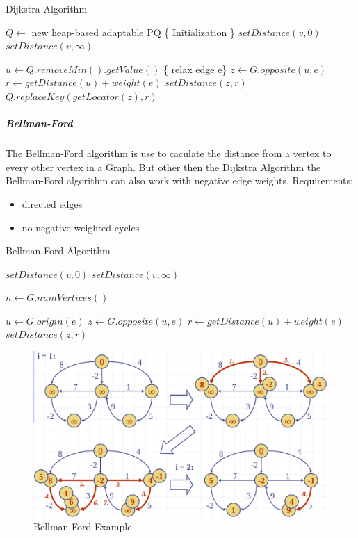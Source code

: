 \documentclass[11pt,twoside,twocolumn,landscape]{article}
\begin{document}
\begin{algorithm}
  \caption{Dijkstra Algorithm}
  \begin{algorithmic}
    \State $Q \gets$ new heap-based adaptable PQ
    \State \{ Initialization \}
    \State $setDistance(v, 0)$
    \Else
    \State $setDistance(v, \infty)$
    \EndIf
    \EndFor

    \State $u \gets Q.removeMin().getValue()$
    \State \{ relax edge e\}
    \State $z \gets G.opposite(u, e)$
    \State $r \gets getDistance(u) + weight(e)$
    \State $setDistance(z,r)$
    \State $Q.replaceKey(getLocator(z), r)$
    \EndIf
    \EndFor
    \EndWhile
    \EndProcedure
  \end{algorithmic}
\end{algorithm}

\subparagraph{Bellman-Ford}
\label{sec:orgafa3501}

The Bellman-Ford algorithm is use to caculate the distance from a vertex to every other vertex in a \href{../../../roam/20220201163000-graph.org}{Graph}.
But other then the \href{../../../roam/20220202132913-dijkstra_algorithm.org}{Dijkstra Algorithm} the Bellman-Ford algorithm can also work with negative edge weights.
Requirements:
\begin{itemize}
\item directed edges
\item no negative weighted cycles
\end{itemize}


\begin{algorithm}
  \caption{Bellman-Ford Algorithm}
  \begin{algorithmic}
    \State $setDistance(v, 0)$
    \Else
    \State $setDistance(v, \infty)$
    \EndIf
    \EndFor

    \State $n \gets G.numVertices()$

    \State $u \gets G.origin(e)$
    \State $z \gets G.opposite(u,e)$
    \State $r \gets getDistance(u) + weight(e)$
    \State $setDistance(z,r)$
    \EndIf
    \EndFor
    \EndFor
    \EndProcedure
  \end{algorithmic}
\end{algorithm}


\begin{figure}[htbp]
\centering
\includegraphics[width=.9\linewidth]{img/bellman_ford_example.png}
\caption{\label{fig:org61d83d7}Bellman-Ford Example}
\end{figure}
\end{document}
